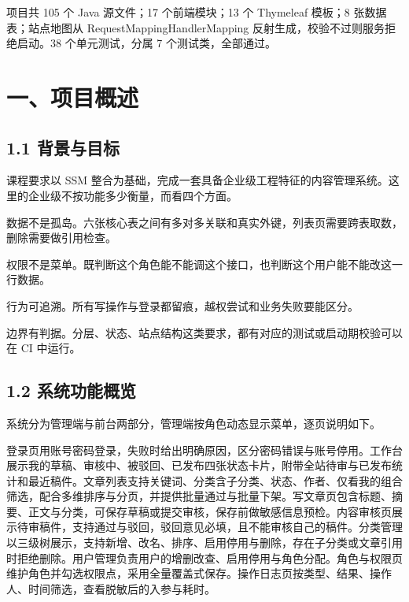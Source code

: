 \documentclass[zihao=-4,UTF8,openany]{ctexart}
\renewcommand{\_}{\textunderscore\allowbreak}
\begin{document}
项目共 105 个 Java 源文件；17 个前端模块；13 个 Thymeleaf 模板；8 张数据表；站点地图从 RequestMappingHandlerMapping 反射生成，校验不过则服务拒绝启动。38 个单元测试，分属 7 个测试类，全部通过。

\section*{\texorpdfstring{\textbf{一、项目概述}}{一、项目概述}}\label{ux4e00ux9879ux76eeux6982ux8ff0}

\subsection*{\texorpdfstring{\textbf{1.1 背景与目标}}{1.1 背景与目标}}\label{ux80ccux666fux4e0eux76eeux6807}

课程要求以 SSM 整合为基础，完成一套具备企业级工程特征的内容管理系统。这里的企业级不按功能多少衡量，而看四个方面。

数据不是孤岛。六张核心表之间有多对多关联和真实外键，列表页需要跨表取数，删除需要做引用检查。

权限不是菜单。既判断这个角色能不能调这个接口，也判断这个用户能不能改这一行数据。

行为可追溯。所有写操作与登录都留痕，越权尝试和业务失败要能区分。

边界有判据。分层、状态、站点结构这类要求，都有对应的测试或启动期校验可以在 CI 中运行。

\subsection*{\texorpdfstring{\textbf{1.2 系统功能概览}}{1.2 系统功能概览}}\label{ux6253ux5f00ux80fdux5e72ux4ec0ux4e48}

系统分为管理端与前台两部分，管理端按角色动态显示菜单，逐页说明如下。

登录页用账号密码登录，失败时给出明确原因，区分密码错误与账号停用。工作台展示我的草稿、审核中、被驳回、已发布四张状态卡片，附带全站待审与已发布统计和最近稿件。文章列表支持关键词、分类含子分类、状态、作者、仅看我的组合筛选，配合多维排序与分页，并提供批量通过与批量下架。写文章页包含标题、摘要、正文与分类，可保存草稿或提交审核，保存前做敏感信息预检。内容审核页展示待审稿件，支持通过与驳回，驳回意见必填，且不能审核自己的稿件。分类管理以三级树展示，支持新增、改名、排序、启用停用与删除，存在子分类或文章引用时拒绝删除。用户管理负责用户的增删改查、启用停用与角色分配。角色与权限页维护角色并勾选权限点，采用全量覆盖式保存。操作日志页按类型、结果、操作人、时间筛选，查看脱敏后的入参与耗时。
\end{document}

